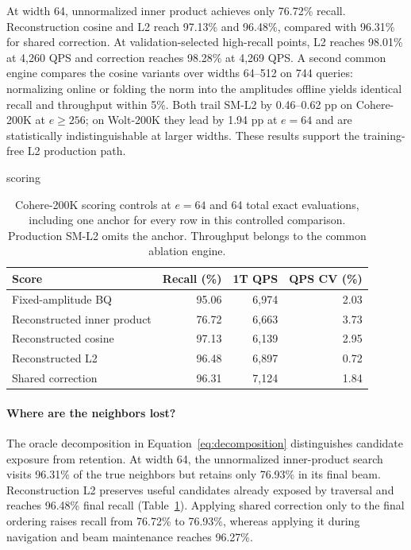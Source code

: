 At width 64, unnormalized inner product achieves only 76.72\% recall. Reconstruction cosine and L2 reach 97.13\% and 96.48\%, compared with 96.31\% for shared correction. At validation-selected high-recall points, L2 reaches 98.01\% at 4,260 QPS and correction reaches 98.28\% at 4,269 QPS. A second common engine compares the cosine variants over widths 64--512 on 744 queries: normalizing online or folding the norm into the amplitudes offline yields identical recall and throughput within 5\%. Both trail SM-L2 by 0.46--0.62 pp on Cohere-200K at $e\ge256$; on Wolt-200K they lead by 1.94 pp at $e=64$ and are statistically indistinguishable at larger widths. These results support the training-free L2 production path.

\begin{table}[t]
\caption{Cohere-200K scoring controls at $e=64$ and 64 total exact evaluations, including one anchor for every row in this controlled comparison. Production SM-L2 omits the anchor. Throughput belongs to the common ablation engine.}
\label{tab:scoring}
\centering
\begin{quivercheckedtable}{scoring}
\begin{tabular}{lrrr}
\toprule
Score & Recall (\%) & 1T QPS & QPS CV (\%)\\
\midrule
Fixed-amplitude BQ & 95.06 & 6,974 & 2.03\\
Reconstructed inner product & 76.72 & 6,663 & 3.73\\
Reconstructed cosine & 97.13 & 6,139 & 2.95\\
Reconstructed L2 & 96.48 & 6,897 & 0.72\\
Shared correction & 96.31 & 7,124 & 1.84\\
\bottomrule
\end{tabular}
\end{quivercheckedtable}
\end{table}

\paragraph{Where are the neighbors lost?}
The oracle decomposition in Equation~\eqref{eq:decomposition} distinguishes candidate exposure from retention. At width 64, the unnormalized inner-product search visits 96.31\% of the true neighbors but retains only 76.93\% in its final beam. Reconstruction L2 preserves useful candidates already exposed by traversal and reaches 96.48\% final recall (Table~\ref{tab:scoring}). Applying shared correction only to the final ordering raises recall from 76.72\% to 76.93\%, whereas applying it during navigation and beam maintenance reaches 96.27\%.

